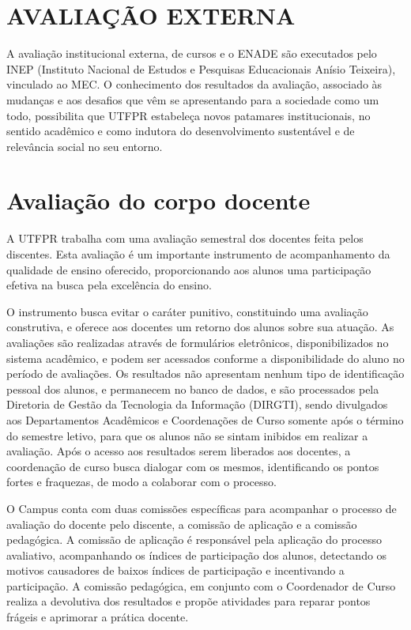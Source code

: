 \section{AVALIAÇÃO EXTERNA}

A avaliação institucional externa, de cursos e o ENADE são executados pelo INEP (Instituto Nacional de Estudos e Pesquisas Educacionais Anísio Teixeira), vinculado ao MEC. O conhecimento dos resultados da avaliação, associado às mudanças e aos desafios que vêm se apresentando para a sociedade como um todo, possibilita que UTFPR estabeleça novos patamares institucionais, no sentido acadêmico e como indutora do desenvolvimento sustentável e de relevância social no seu entorno.

\section{Avaliação do corpo docente}

A UTFPR trabalha com uma avaliação semestral dos docentes feita pelos discentes. Esta avaliação é um importante instrumento de acompanhamento da qualidade de ensino oferecido, proporcionando aos alunos uma participação efetiva na busca pela excelência do ensino.

O instrumento busca evitar o caráter punitivo, constituindo uma avaliação construtiva, e oferece aos docentes um retorno dos alunos sobre sua atuação. As avaliações são realizadas através de formulários eletrônicos, disponibilizados no sistema acadêmico, e podem ser acessados conforme a disponibilidade do aluno no período de avaliações. Os resultados não apresentam nenhum tipo de identificação pessoal dos alunos, e permanecem no banco de dados, e são processados pela Diretoria de Gestão da Tecnologia da Informação (DIRGTI), sendo divulgados aos Departamentos Acadêmicos e Coordenações de Curso somente após o término do semestre letivo, para que os alunos não se sintam inibidos em realizar a avaliação. Após o acesso aos resultados serem liberados aos docentes, a coordenação de curso busca dialogar com os mesmos, identificando os pontos fortes e fraquezas, de modo a colaborar com o processo.


O Campus conta com duas comissões específicas para acompanhar o processo de avaliação do docente pelo discente, a comissão de aplicação e a comissão pedagógica. A comissão de aplicação é responsável pela aplicação do processo avaliativo, acompanhando os índices de participação dos alunos, detectando os motivos causadores de baixos índices de participação e incentivando a participação. A comissão pedagógica, em conjunto com o Coordenador de Curso realiza a devolutiva dos resultados e propõe atividades para reparar pontos frágeis e aprimorar a prática docente.

